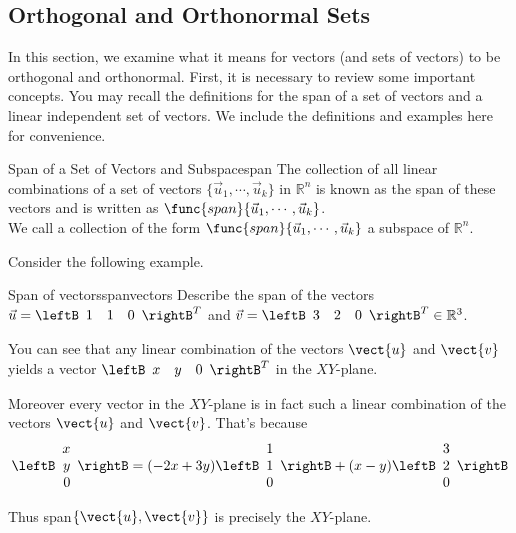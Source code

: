 \subsection{Orthogonal and Orthonormal Sets}

In this section, we examine what it means for vectors (and sets of
vectors) to be orthogonal and orthonormal. First, it is necessary to
review some important concepts. You may recall the definitions for the
span of a set of vectors and a linear independent set of vectors. We
include the definitions and examples here for convenience.

\begin{definition}{Span of a Set of Vectors and Subspace}{span}
The collection of all linear combinations of a set of vectors $\{ \vec{u}_1,
\cdots ,\vec{u}_k\}$ in $\mathbb{R}^{n}$ is known as the span of these
vectors and is written as $\func{span} \{\vec{u}_1, \cdots ,
\vec{u}_k\}$. \\ 
We call a collection of the form $\func{span} \{\vec{u}_1, \cdots , \vec{u}_k\}$ 
a subspace of $\mathbb{R}^{n}$.
\end{definition}

Consider the following example. 

\begin{example}{Span of vectors}{spanvectors}
Describe the span of the vectors $\vec{u}=\leftB 
\begin{array}{rrr}
1  & 1 & 0
\end{array}
\rightB^T$ and
$\vec{v}=\leftB 
\begin{array}{rrr}
3  & 2 & 0
\end{array}
\rightB^T \in \mathbb{R}^{3}$.
\end{example}

\begin{solution}
You can see that any linear combination of the vectors $\vect{u}$ and $\vect{v}$ yields a vector 
$\leftB 
\begin{array}{rrr}
x  & y & 0
\end{array}
\rightB^T$ in the $XY$-plane. 

Moreover every vector in the $XY$-plane is in fact such a linear
combination of the vectors $\vect{u}$ and $\vect{v}$. That's because
\[ \leftB 
\begin{array}{r}
x \\
y \\
0
\end{array}
\rightB 
=
(-2x+3y) \leftB 
\begin{array}{r}
1 \\
1 \\
0
\end{array}
\rightB
+
(x-y)\leftB 
\begin{array}{r}
3 \\
2 \\
0
\end{array}
\rightB 
\]

Thus  span$\{\vect{u},\vect{v}\}$ is precisely the $XY$-plane.
\end{solution}

